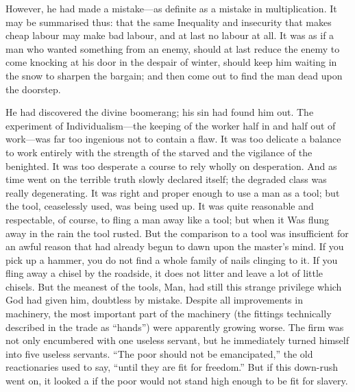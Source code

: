 \documentclass{book}
\begin{document}
However, he had made a mistake—as definite as a mistake in multiplication. It may be summarised thus: that the same Inequality and insecurity that makes cheap labour may make bad labour, and at last no labour at all. It was as if a man who wanted something from an enemy, should at last reduce the enemy to come knocking at his door in the despair of winter, should keep him waiting in the snow to sharpen the bargain; and then come out to find the man dead upon the doorstep.

He had discovered the divine boomerang; his sin had found him out. The experiment of Individualism—the keeping of the worker half in and half out of work—was far too ingenious not to contain a flaw. It was too delicate a balance to work entirely with the strength of the starved and the vigilance of the benighted. It was too desperate a course to rely wholly on desperation. And as time went on the terrible truth slowly declared itself; the degraded class was really degenerating. It was right and proper enough to use a man as a tool; but the tool, ceaselessly used, was being used up. It was quite reasonable and respectable, of course, to fling a man away like a tool; but when it Was flung away in the rain the tool rusted. But the comparison to a tool was insufficient for an awful reason that had already begun to dawn upon the master’s mind. If you pick up a hammer, you do not find a whole family of nails clinging to it. If you fling away a chisel by the roadside, it does not litter and leave a lot of little chisels. But the meanest of the tools, Man, had still this strange privilege which God had given him, doubtless by mistake. Despite all improvements in machinery, the most important part of the machinery (the fittings technically described in the trade as “hands”) were apparently growing worse. The firm was not only encumbered with one useless servant, but he immediately turned himself into five useless servants. “The poor should not be emancipated,” the old reactionaries used to say, “until they are fit for freedom.” But if this down-rush went on, it looked a if the poor would not stand high enough to be fit for slavery.
\end{document}
